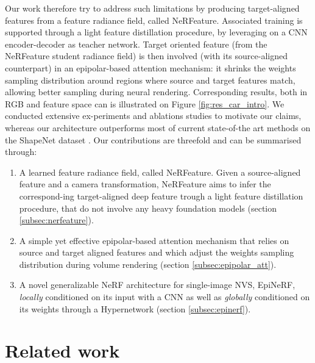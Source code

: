 Our work therefore try to address such limitations by producing target-aligned features from a feature radiance field, called NeRFeature. Associated training is supported through a light feature distillation procedure, by leveraging on a CNN encoder-decoder as teacher network. Target oriented feature (from the NeRFeature student radiance field) is then involved (with its source-aligned counterpart) in an epipolar-based attention mechanism: it shrinks the weights sampling distribution around regions where source and target features match, allowing better sampling during neural rendering. Corresponding results, both in RGB and feature space can is illustrated on Figure \ref{fig:res_car_intro}. We conducted extensive ex\--periments and ablations studies to motivate our claims, whereas our architecture outperforms most of current state-of-the art methods on the ShapeNet dataset \cite{chang2015shapenet}. Our contributions are threefold and can be summarised through: 
\begin{enumerate}
   \item A learned feature radiance field, called NeRFeature. Given a source-aligned feature and a camera transformation, NeRFeature aims to infer the correspond\--ing target-aligned deep feature trough a light feature distillation procedure, that do not involve any heavy foundation models (section \ref{subsec:nerfeature}). 
    \item A simple yet effective epipolar-based attention mechanism that relies on source and target aligned features and which adjust the weights sampling distribution during volume rendering (section \ref{subsec:epipolar_att}). 
    \item A novel generalizable NeRF architecture for single-image NVS, EpiNeRF, \textit{locally} conditioned on its input with a CNN as well as \textit{globally} conditioned on its weights through a Hypernetwork (section \ref{subsec:epinerf}).  
\end{enumerate}

\section{Related work}

